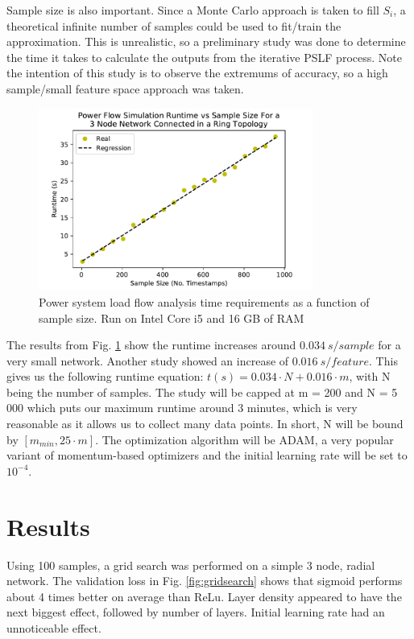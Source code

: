 \documentclass[conference]{IEEEtran}
\begin{document}
Sample size is also important. Since a Monte Carlo approach is taken to fill $S_{i}$, a theoretical infinite number of samples could be used to fit/train the approximation. This is unrealistic, so a preliminary study was done to determine the time it takes to calculate the outputs from the iterative PSLF process. Note the intention of this study is to observe the extremums of accuracy, so a high sample/small feature space approach was taken.

\begin{figure}[h]
	\centering
	\includegraphics[width=9cm]{pslfruntimevssamples.pdf}
	\caption{Power system load flow analysis time requirements as a function of sample size. Run on Intel Core i5 and 16 GB of RAM}
	\label{fig:pslfruntime}
\end{figure}

The results from Fig. \ref{fig:pslfruntime} show the runtime increases around $0.034~s/sample$ for a very small network. Another study showed an increase of $0.016~s/feature$. This gives us the following runtime equation: $t(s) = 0.034\cdot N + 0.016\cdot m$, with N being the number of samples. The study will be capped at m = 200 and N = 5 000 which puts our maximum runtime around 3 minutes, which is very reasonable as it allows us to collect many data points. In short, N will be bound by $[m_{min}, 25\cdot m]$. The optimization algorithm will be ADAM, a very popular variant of momentum-based optimizers and the initial learning rate will be set to $10^{-4}$.
 
\section{Results}
\label{sec:results}

Using 100 samples, a grid search was performed on a simple 3 node, radial network. The validation loss in Fig. \ref{fig:gridsearch} shows that sigmoid performs about 4 times better on average than ReLu. Layer density appeared to have the next biggest effect, followed by number of layers. Initial learning rate had an unnoticeable effect.
\end{document}
